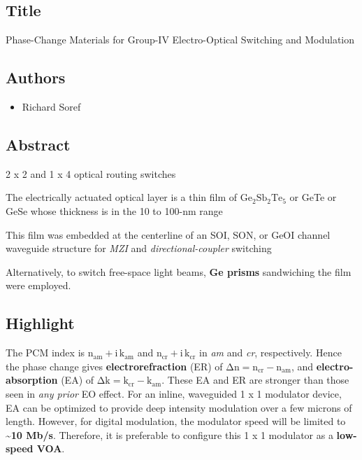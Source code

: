 \documentclass[]{article}
\date{}
\providecommand{\tightlist}{%
  \setlength{\itemsep}{0pt}\setlength{\parskip}{0pt}}
\begin{document}
\subsection{Title}\label{title}

Phase-Change Materials for Group-IV Electro-Optical Switching and
Modulation

\subsection{Authors}\label{authors}

\begin{itemize}
\tightlist
\item
  Richard Soref
\end{itemize}

\subsection{Abstract}\label{abstract}

2 x 2 and 1 x 4 optical routing switches

The electrically actuated optical layer is a thin film of
\(\mathrm{Ge_2 Sb_2 Te_5}\) or GeTe or GeSe whose thickness is in the 10
to 100-nm range

This film was embedded at the centerline of an SOI, SON, or GeOI channel
waveguide structure for \emph{MZI} and \emph{directional-coupler}
switching

Alternatively, to switch free-space light beams, \textbf{Ge prisms}
sandwiching the film were employed.

\subsection{Highlight}\label{highlight}

The PCM index is \(\mathrm{n_{am} + i\,k_{am}}\) and
\(\mathrm{n_{cr} + i\,k_{cr}}\) in \emph{am} and \emph{cr},
respectively. Hence the phase change gives \textbf{electrorefraction}
(ER) of \(\mathrm{\Delta n = n_{cr} -n_{am}}\), and
\textbf{electro-absorption} (EA) of
\(\mathrm{\Delta k = k_{cr} - k_{am}}\). These EA and ER are stronger
than those seen in \emph{any prior} EO effect. For an inline, waveguided
1 x 1 modulator device, EA can be optimized to provide deep intensity
modulation over a few microns of length. However, for digital
modulation, the modulator speed will be limited to
\textbf{\textasciitilde{}10 Mb/s}. Therefore, it is preferable to
configure this 1 x 1 modulator as a \textbf{low-speed VOA}.
\end{document}
